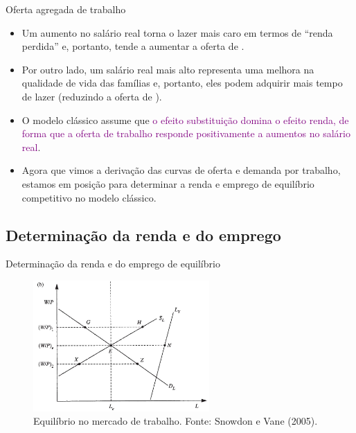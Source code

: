 \documentclass[10pt]{beamer}
\begin{document}
\begin{frame}{Oferta agregada de trabalho}
    \begin{itemize}
        \item Um aumento no salário real torna o lazer mais caro em termos de ``renda perdida'' e, portanto, tende a aumentar a oferta de .\bigskip

        \item Por outro lado, um salário real mais alto representa uma melhora na qualidade de vida das famílias e, portanto, eles podem adquirir mais tempo de lazer (reduzindo a oferta de ).\bigskip\bigskip
        \item O modelo clássico assume que \textcolor{purple}{o efeito substituição domina o efeito renda, de forma que a oferta de trabalho responde positivamente a aumentos no salário real}.\bigskip
        \item Agora que vimos a derivação das curvas de oferta e demanda por trabalho, estamos em posição para determinar a renda e emprego de equilíbrio competitivo no modelo clássico.
    \end{itemize}
\end{frame}

\subsection{Determinação da renda e do emprego}
\begin{frame}{Determinação da renda e do emprego de equilíbrio}
    \begin{figure}
        \centering
        \includegraphics[width=0.6\textwidth]{./figures/aula02_labormarket.JPG}
        \caption{Equilíbrio no mercado de trabalho. Fonte: Snowdon e Vane (2005).}
        \label{fig3}
    \end{figure}
\end{frame}
\end{document}
